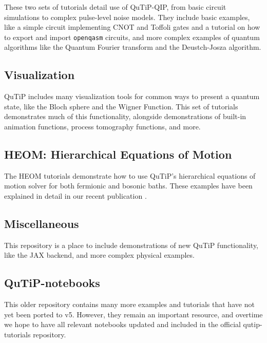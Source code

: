 \documentclass[preprint,3p,sort&compress]{elsarticle}
\def\code#1{\texttt{#1}}
\begin{document}
These two sets of tutorials detail use of QuTiP-QIP, from basic circuit simulations to complex pulse-level noise models.  They include basic examples, like a simple circuit implementing CNOT and Toffoli gates and a tutorial on how to export and import \code{openqasm} circuits, and more complex examples of quantum algorithms like the Quantum Fourier transform and the Deustch-Josza algorithm.


\subsection{Visualization}

QuTiP includes many visualization tools for common ways to present a quantum state, like the Bloch sphere and the Wigner Function. This set of tutorials demonstrates much of this functionality, alongside demonstrations of built-in animation functions, process tomography functions, and more.

\subsection{HEOM: Hierarchical Equations of Motion}

The HEOM tutorials demonstrate how to use QuTiP's hierarchical equations of motion solver for both fermionic and bosonic baths. These examples have been explained in detail in our recent publication \cite{lambert2020bofinheom}.

\subsection{Miscellaneous}

This repository is a place to include demonstrations of new QuTiP functionality, like the JAX backend, and more complex physical examples.



\subsection{QuTiP-notebooks}

This older repository \cite{qnotebooks} contains many more examples and tutorials that have not yet been ported to v5.  However, they remain an important resource, and overtime we hope to have all relevant notebooks updated and included in the official qutip-tutorials repository.


\end{document}

